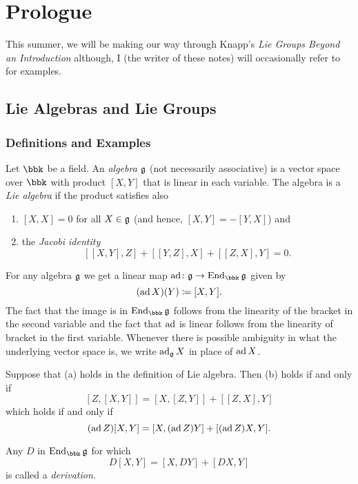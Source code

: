 \chapter{Prologue}
This summer, we will be making our way through Knapp's \emph{Lie Groups
  Beyond an Introduction} \cite{knapp} although, I (the writer of these
notes) will occasionally refer to \cite{hall} for examples.


\section{Lie Algebras and Lie Groups}
\subsection{Definitions and Examples}
Let $\bbk$ be a field. An \emph{algebra $\mathfrak{g}$} (not necessarily
associative) is a vector space over $\bbk$ with product $[X,Y]$ that is
linear in each variable. The algebra is a \emph{Lie algebra} if the product
satisfies also
\begin{enumerate}[label=(\alph*),noitemsep]
\item $[X,X]=0$ for all $X\in\mathfrak{g}$ (and hence, $[X,Y]=-[Y,X]$) and
\item the \emph{Jacobi identity}
\[
[[X,Y],Z]+[[Y,Z],X]+[[Z,X],Y]=0.
\]
\end{enumerate}

For any algebra $\mathfrak{g}$ we get a linear map
$\ad\colon\frakg\to\End_\bbk\frakg$ given by
\[
(\operatorname{ad} X)(Y)\coloneqq[X,Y].
\]
The fact that the image is in $\End_\bbk\frakg$ follows from the linearity
of the bracket in the second variable and the fact that $\operatorname{ad}$ is linear
follows from the linearity of bracket in the first variable. Whenever there
is possible ambiguity in what the underlying vector space is, we write
$\operatorname{ad}_{\mathfrak{g}} X$ in place of $\operatorname{ad} X$.

Suppose that (a) holds in the definition of Lie algebra. Then (b) holds if
and only if
\[
[Z,[X,Y]]=[X,[Z,Y]]+[[Z,X],Y]
\]
which holds if and only if
\begin{equation}
  \label{eq:1:1}
(\operatorname{ad} Z)[X,Y]=[X,(\operatorname{ad} Z)Y]+[(\operatorname{ad} Z)X,Y].
\end{equation}

Any $D$ in $\End_\bbk\frakg$ for which
\begin{equation}
  \label{eq:1:2}
  D[X,Y]=[X,DY]+[DX,Y]
\end{equation}
is called a \emph{derivation}.

